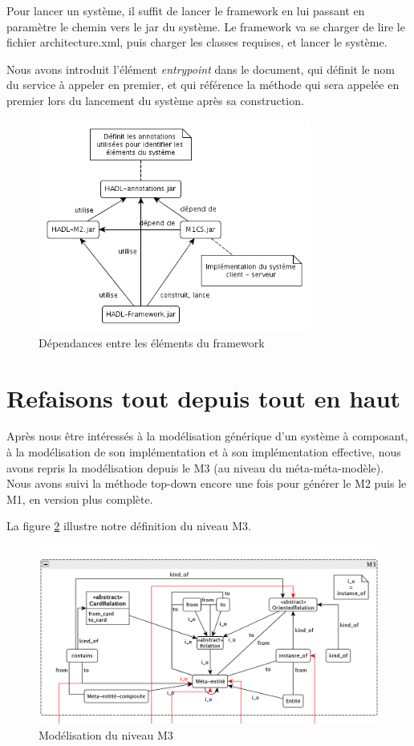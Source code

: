 \documentclass[french,a4paper,titlepage]{article}
\begin{document}
		Pour lancer un système, il suffit de lancer le framework en lui passant en paramètre le chemin vers le jar du système. Le framework va se charger de lire le fichier architecture.xml, puis charger les classes requises, et lancer le système.
		
		Nous avons introduit l'élément \emph{entrypoint} dans le document, qui définit le nom du service à appeler en premier, et qui référence la méthode qui sera appelée en premier lors du lancement du système après sa construction.
		
		\begin{figure}[htb]
			\centering
			\includegraphics[width=0.8\textwidth]{./framework.png}
			\caption{Dépendances entre les éléments du framework}
			\label{fig:framework}
		\end{figure}
	
	
	\section{Refaisons tout depuis tout en haut}
	
		Après nous être intéressés à la modélisation générique d'un système à composant, à la modélisation de son implémentation et à son implémentation effective, nous avons repris la modélisation depuis le M3 (au niveau du méta-méta-modèle). Nous avons suivi la méthode top-down encore une fois pour générer le M2 puis le M1, en version plus complète.
		
		La figure \ref{fig:M3} illustre notre définition du niveau M3.
		
		\begin{figure}[htb]
			\centering
			\includegraphics[width=\textwidth]{m3.png}
			\caption{Modélisation du niveau M3}
			\label{fig:M3}
		\end{figure}
		
\end{document}
